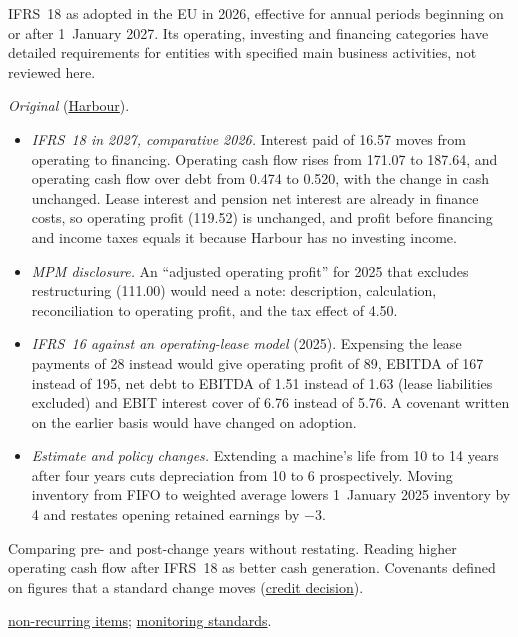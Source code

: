 \begin{qfmethod}
 IFRS~18 as adopted in the EU in 2026, effective for annual periods beginning on or after 1~January 2027. Its operating, investing and financing categories have detailed requirements for entities with specified main business activities, not reviewed here.

 \emph{Original} (\hyperref[ex:harbour-tools-statements]{Harbour}).
\begin{itemize}
\item \emph{IFRS~18 in 2027, comparative 2026.} Interest paid of 16.57 moves from operating to financing. Operating cash flow rises from 171.07 to 187.64, and operating cash flow over debt from 0.474 to 0.520, with the change in cash unchanged. Lease interest and pension net interest are already in finance costs, so operating profit (119.52) is unchanged, and profit before financing and income taxes equals it because Harbour has no investing income.
\item \emph{MPM disclosure.} An ``adjusted operating profit'' for 2025 that excludes restructuring (111.00) would need a note: description, calculation, reconciliation to operating profit, and the tax effect of 4.50.
\item \emph{IFRS~16 against an operating-lease model} (2025). Expensing the lease payments of 28 instead would give operating profit of 89, EBITDA of 167 instead of 195, net debt to EBITDA of 1.51 instead of 1.63 (lease liabilities excluded) and EBIT interest cover of 6.76 instead of 5.76. A covenant written on the earlier basis would have changed on adoption.
\item \emph{Estimate and policy changes.} Extending a machine's life from 10 to 14 years after four years cuts depreciation from 10 to 6 prospectively. Moving inventory from FIFO to weighted average lowers 1~January 2025 inventory by 4 and restates opening retained earnings by $-3$.
\end{itemize}

 Comparing pre- and post-change years without restating. Reading higher operating cash flow after IFRS~18 as better cash generation. Covenants defined on figures that a standard change moves (\hyperref[ex:integrated-credit-decision]{credit decision}).

 \hyperref[meth:non-recurring-items]{non-recurring items}; \hyperref[def:ifrs-us-gaap-reporting-systems]{monitoring standards}.

\end{qfmethod}
